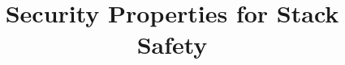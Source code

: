 \documentclass[acmtog,review,anonymous]{acmart}\settopmatter{printfolios=true,printccs=false,printacmref=false}
\begin{document}
\title{Security Properties for Stack Safety}         %







\end{document}
